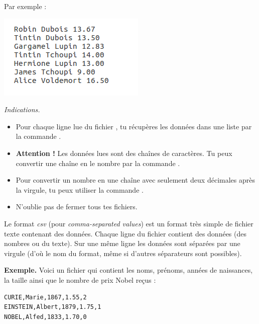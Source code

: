 \documentclass[11pt,class=report,crop=false]{standalone}
\begin{document}
\begin{activite}
\begin{enumerate}
    Par exemple :
\begin{center}
\includegraphics[scale=0.7]{ecran-fichiers-1b}
\end{center}  

  \emph{Indications.}
  \begin{itemize}
    	\item Pour chaque ligne lue du fichier , tu récupères les données dans  une liste par la commande .
    	
    	\item \textbf{Attention !} Les données lues sont des chaînes de caractères. Tu peux convertir une chaîne  en le nombre  par la commande .
    	
    	\item Pour convertir un nombre en une chaîne avec seulement deux décimales après la virgule, tu peux utiliser la commande .
    	
    	\item N'oublie pas de fermer tous tes fichiers.
    	
   \end{itemize}
    
\end{enumerate}   
     
\end{activite}



\begin{cours}
Le format \emph{csv} (pour  \emph{comma-separated values}) est un format très simple de fichier texte contenant des données.
Chaque ligne du fichier contient des données (des nombres ou du texte). Sur une même ligne les données sont séparées par une virgule (d'où le nom du format, même si d'autres séparateurs sont possibles).

\textbf{Exemple.} Voici un fichier qui contient les noms, prénoms, années de naissances, la taille ainsi que le nombre de prix Nobel reçus :
 \begin{center}
\begin{minipage}{0.4\textwidth}
\begin{lstlisting}
CURIE,Marie,1867,1.55,2
EINSTEIN,Albert,1879,1.75,1
NOBEL,Alfed,1833,1.70,0
\end{lstlisting}
\end{minipage}
\end{center}

\end{cours}
\end{document}
